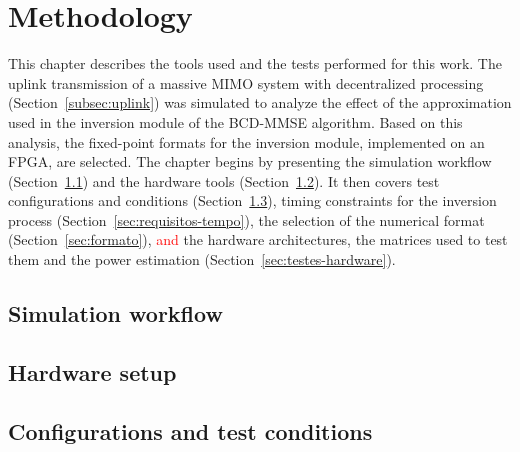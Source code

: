 \chapter{Methodology}\label{chap:metodologia}
This chapter describes the tools used and the tests performed for this work. The uplink transmission of a massive MIMO system with decentralized processing (Section~\ref{subsec:uplink}) was simulated to analyze the effect of the approximation used in the inversion module of the BCD-MMSE algorithm. Based on this analysis, the fixed-point formats for the inversion module, implemented on an FPGA, are selected. The chapter begins by presenting the simulation workflow (Section~\ref{sec:simulador}) and the hardware tools (Section~\ref{sec:setup-hardware}). It then covers test configurations and conditions (Section~\ref{sec:configuracoes}), timing constraints for the inversion process (Section~\ref{sec:requisitos-tempo}), the selection of the numerical format (Section~\ref{sec:formato}), \textcolor{red}{and} the hardware architectures, the matrices used to test them and the power estimation (Section~\ref{sec:testes-hardware}).

\section{\texorpdfstring{Simulation workflow}{Simulation workflow}}\label{sec:simulador}


\section{\texorpdfstring{Hardware setup}{Hardware setup}}\label{sec:setup-hardware}


\section{\texorpdfstring{Configurations and test conditions}{Configurations and test conditions}}\label{sec:configuracoes}
